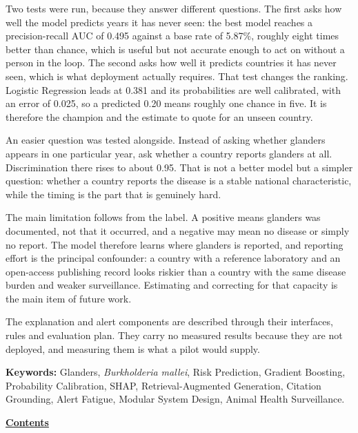 \documentclass[10pt,openany]{report}
\begin{document}
\vspace{0.5em}
\noindent
Two tests were run, because they answer different questions. The first asks how well the model predicts
years it has never seen: the best model reaches a precision-recall AUC of 0.495 against a base
rate of 5.87\%, roughly eight times better than chance, which is useful but not accurate enough
to act on without a person in the loop. The second asks how well it predicts countries it has never
seen, which is what deployment actually requires. That test changes the ranking. Logistic Regression leads at
0.381 and its probabilities are well calibrated, with an error of 0.025, so a predicted 0.20
means roughly one chance in five. It is therefore the champion and the estimate to quote for an
unseen country.

\vspace{0.4em}
\noindent
An easier question was tested alongside. Instead of asking whether glanders appears in one particular
year, ask whether a country reports glanders at all. Discrimination there rises to about 0.95. That is
not a better model but a simpler question: whether a country reports the disease is a stable national
characteristic, while the timing is the part that is genuinely hard.

\vspace{0.4em}
\noindent
The main limitation follows from the label. A positive means glanders was documented, not that it
occurred, and a negative may mean no disease or simply no report. The model therefore learns where
glanders is reported, and reporting effort is the principal confounder: a country with a reference
laboratory and an open-access publishing record looks riskier than a country with the same disease
burden and weaker surveillance. Estimating and correcting for that capacity is the main item of future
work.

\vspace{0.4em}
\noindent
The explanation and alert components are described through their interfaces, rules and evaluation
plan. They carry no measured results because they are not deployed, and measuring them is what a pilot
would supply.

\vspace{0.7em}
\noindent
\textbf{Keywords:} Glanders, \textit{Burkholderia mallei}, Risk Prediction, Gradient Boosting,
Probability Calibration, SHAP, Retrieval-Augmented Generation, Citation Grounding, Alert Fatigue,
Modular System Design, Animal Health Surveillance.

\newpage
\pagestyle{plain}
\noindent\underline{\textbf{Contents}}
\vspace{0.55cm}
\end{document}
